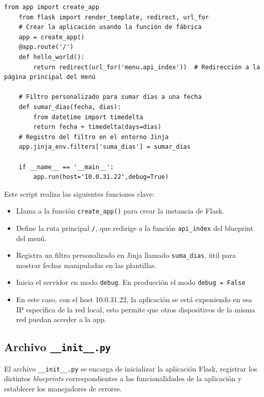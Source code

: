 \documentclass[10pt]{book}
\begin{document}
    \begin{lstlisting}[style=pythonclean, caption={Script principal \texttt{run.py}}]
    from app import create_app
    from flask import render_template, redirect, url_for
    # Crear la aplicación usando la función de fábrica
    app = create_app()
    @app.route('/')
    def hello_world():
        return redirect(url_for('menu.api_index'))  # Redirección a la página principal del menú

    # Filtro personalizado para sumar días a una fecha
    def sumar_dias(fecha, dias):
        from datetime import timedelta
        return fecha + timedelta(days=dias)
    # Registro del filtro en el entorno Jinja
    app.jinja_env.filters['suma_dias'] = sumar_dias

    if __name__ == '__main__':
        app.run(host='10.0.31.22',debug=True)
    \end{lstlisting}
    
    Este script realiza las siguientes funciones clave:
    
    \begin{itemize}
      \item Llama a la función \texttt{create\_app()} para crear la instancia de Flask.
      \item Define la ruta principal \texttt{/}, que redirige a la función \texttt{api\_index} del blueprint del menú.
      \item Registra un filtro personalizado en Jinja llamado \texttt{suma\_dias}, útil para mostrar fechas manipuladas en las plantillas.
      \item Inicia el servidor en modo \texttt{debug}. En producción el modo \texttt{debug = False} 
        \item En este caso, con el host 10.0.31.22, la aplicación se está exponiendo en esa IP específica de la red local, esto permite que otros dispositivos de la misma red puedan acceder a la app.
    \end{itemize}
    
\subsection{Archivo \texttt{\_\_init\_\_.py}}
    
    El archivo \texttt{\_\_init\_\_.py} se encarga de inicializar la aplicación Flask, registrar los distintos \textit{blueprints} correspondientes a las funcionalidades de la aplicación y establecer los manejadores de errores.
    
\end{document}
